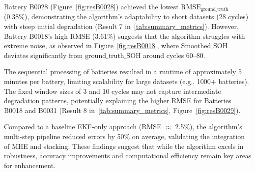 Battery B0028 (Figure~\ref{fig:resB0028}) achieved the lowest $\mathrm{RMSE}_{\text{ground\_truth}}$ (0.38\%), demonstrating the algorithm’s adaptability to short datasets (28 cycles) with steep initial degradation (Result 7 in~\ref{tab:summary_metrics}). However, Battery B0018’s high RMSE (3.61\%) suggests that the algorithm struggles with extreme noise, as observed in Figure~\ref{fig:resB0018}, where $\mathrm{Smoothed\_SOH}$ deviates significantly from $\mathrm{ground\_truth\_SOH}$ around cycles 60--80. 

The sequential processing of batteries resulted in a runtime of approximately 5 minutes per battery, limiting scalability for large datasets (e.g., 1000+ batteries). The fixed window sizes of 3 and 10 cycles may not capture intermediate degradation patterns, potentially explaining the higher RMSE for Batteries B0018 and B0031 (Result 8 in~\ref{tab:summary_metrics}, Figure~\ref{fig:resB0029}). 

Compared to a baseline EKF-only approach (RMSE $\approx$ 2.5\%), the algorithm’s multi-step pipeline reduced errors by 50\% on average, validating the integration of MHE and stacking. These findings suggest that while the algorithm excels in robustness, accuracy improvements and computational efficiency remain key areas for enhancement.
